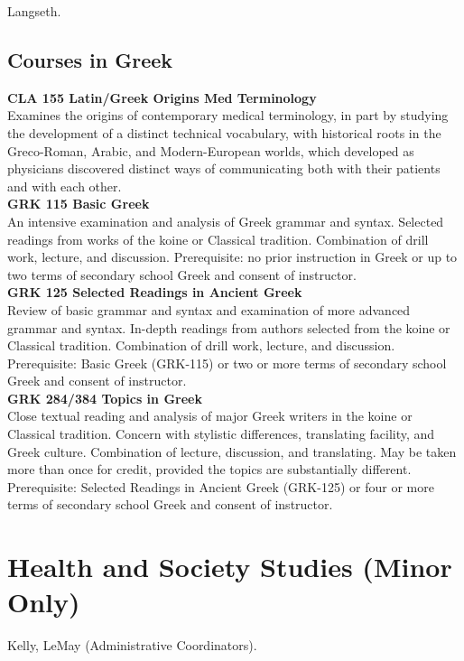 \documentclass[
  letterpaper,
]{scrbook}
\begin{document}
Langseth.

\subsection{Courses in Greek}\label{courses-in-greek}

\textbf{CLA 155 Latin/Greek Origins Med Terminology}\\
Examines the origins of contemporary medical terminology, in part by
studying the development of a distinct technical vocabulary, with
historical roots in the Greco-Roman, Arabic, and Modern-European worlds,
which developed as physicians discovered distinct ways of communicating
both with their patients and with each other.\\
\textbf{GRK 115 Basic Greek}\\
An intensive examination and analysis of Greek grammar and syntax.
Selected readings from works of the koine or Classical tradition.
Combination of drill work, lecture, and discussion. Prerequisite: no
prior instruction in Greek or up to two terms of secondary school Greek
and consent of instructor.\\
\textbf{GRK 125 Selected Readings in Ancient Greek}\\
Review of basic grammar and syntax and examination of more advanced
grammar and syntax. In-depth readings from authors selected from the
koine or Classical tradition. Combination of drill work, lecture, and
discussion. Prerequisite: Basic Greek (GRK-115) or two or more terms of
secondary school Greek and consent of instructor.\\
\textbf{GRK 284/384 Topics in Greek}\\
Close textual reading and analysis of major Greek writers in the koine
or Classical tradition. Concern with stylistic differences, translating
facility, and Greek culture. Combination of lecture, discussion, and
translating. May be taken more than once for credit, provided the topics
are substantially different. Prerequisite: Selected Readings in Ancient
Greek (GRK-125) or four or more terms of secondary school Greek and
consent of instructor.

\section{Health and Society Studies (Minor
Only)}\label{sec-health-and-society-studies}

Kelly, LeMay (Administrative Coordinators).
\end{document}
